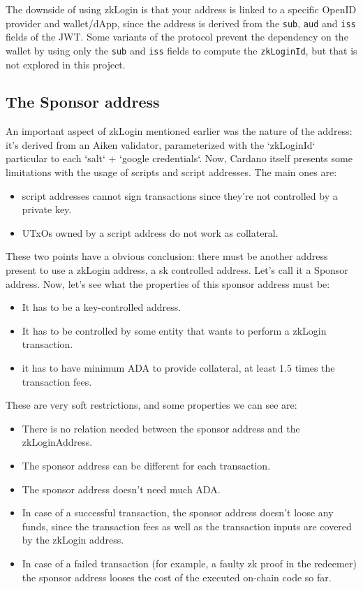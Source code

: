 \documentclass{article}
\begin{document}
The downside of using zkLogin is that your address is linked to a specific OpenID provider and wallet/dApp, since the address is derived from the \texttt{sub}, \texttt{aud} and \texttt{iss} fields of the JWT. Some variants of the protocol prevent the dependency on the wallet by using only the \texttt{sub} and \texttt{iss} fields to compute the \texttt{zkLoginId}, but that is not explored in this project.

\subsection{The Sponsor address}
An important aspect of zkLogin mentioned earlier was the nature of the address: it's derived from an Aiken validator, parameterized with the `zkLoginId` particular to each `salt` + `google credentials`. Now, Cardano itself presents some limitations with the usage of scripts and script addresses. The main ones are:

\begin{itemize}
    \item script addresses cannot sign transactions since they're not controlled by a private key.
    \item UTxOs owned by a script address do not work as collateral.
\end{itemize}

These two points have a obvious conclusion: there must be another address present to use a zkLogin address, a sk controlled address. Let's call it a Sponsor address. Now, let's see what the properties of this sponsor address must be:

\begin{itemize}
    \item It has to be a key-controlled address.
    \item It has to be controlled by some entity that wants to perform a zkLogin transaction.
    \item it has to have minimum ADA to provide collateral, at least $1.5$ times the transaction fees.
\end{itemize}

These are very soft restrictions, and some properties we can see are:

\begin{itemize}
    \item There is no relation needed between the sponsor address and the zkLoginAddress.
    \item The sponsor address can be different for each transaction.
    \item The sponsor address doesn't need much ADA.
    \item In case of a successful transaction, the sponsor address doesn't loose any funds, since the transaction fees as well as the transaction inputs are covered by the zkLogin address.
    \item In case of a failed transaction (for example, a faulty zk proof in the redeemer) the sponsor address looses the cost of the executed on-chain code so far.
\end{itemize}
\end{document}
